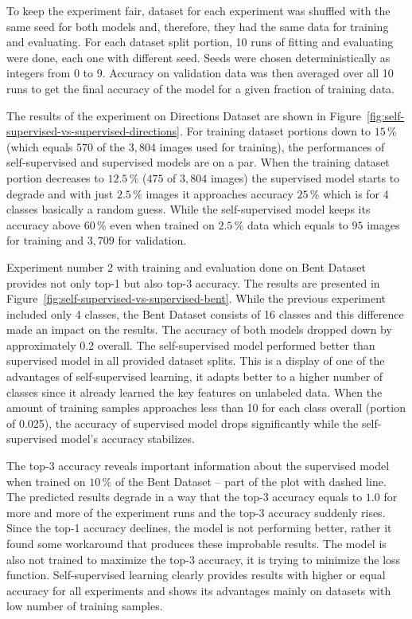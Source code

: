 To keep the experiment fair, dataset for each experiment was shuffled with the same seed for both models and, therefore, they had the same data for training and evaluating. For each dataset split portion, 10 runs of fitting and evaluating were done, each one with different seed. Seeds were chosen deterministically as integers from $0$ to $9$. Accuracy on validation data was then averaged over all 10 runs to get the final accuracy of the model for a given fraction of training data.

The results of the experiment on Directions Dataset are shown in Figure~\ref{fig:self-supervised-vs-supervised-directions}. For training dataset portions down to $15\,\%$ (which equals $570$ of the $3{,}804$ images used for training), the performances of self-supervised and supervised models are on a par. When the training dataset portion decreases to $12.5\,\%$ ($475$ of $3{,}804$ images) the supervised model starts to degrade and with just $2.5\,\%$ images it approaches accuracy $25\,\%$ which is for 4 classes basically a random guess. While the self-supervised model keeps its accuracy above $60\,\%$ even when trained on $2.5\,\%$ data which equals to $95$ images for training and $3{,}709$ for validation.

Experiment number 2 with training and evaluation done on Bent Dataset provides not only top-1 but also top-3 accuracy. The results are presented in Figure~\ref{fig:self-supervised-vs-supervised-bent}. While the previous experiment included only 4 classes, the Bent Dataset consists of 16 classes and this difference made an impact on the results. The accuracy of both models dropped down by approximately 0.2 overall. The self-supervised model performed better than supervised model in all provided dataset splits. This is a display of one of the advantages of self-supervised learning, it adapts better to a higher number of classes since it already learned the key features on unlabeled data. When the amount of training samples approaches less than 10 for each class overall (portion of 0.025), the accuracy of supervised model drops significantly while the self-supervised model's accuracy stabilizes.

The top-3 accuracy reveals important information about the supervised model when trained on $10\,\%$ of the Bent Dataset -- part of the plot with dashed line. The predicted results degrade in a way that the top-3 accuracy equals to $1.0$ for more and more of the experiment runs and the top-3 accuracy suddenly rises. Since the top-1 accuracy declines, the model is not performing better, rather it found some workaround that produces these improbable results. The model is also not trained to maximize the top-3 accuracy, it is trying to minimize the loss function. Self-supervised learning clearly provides results with higher or equal accuracy for all experiments and shows its advantages mainly on datasets with low number of training samples.

